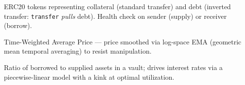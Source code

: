 \documentclass[10pt,a4paper,twocolumn]{article}
\theoremstyle{definition}
\theoremstyle{plain}
\theoremstyle{remark}
\begin{document}
\begin{description}[leftmargin=!,labelwidth=2.5cm]
    \item[Supply / Borrow Position] ERC20 tokens representing collateral (standard transfer) and debt (inverted transfer: \texttt{transfer} \emph{pulls} debt). Health check on sender (supply) or receiver (borrow).

    \item[TWAP] Time-Weighted Average Price --- price smoothed via log-space EMA (geometric mean temporal averaging) to resist manipulation.

    \item[Utilization] Ratio of borrowed to supplied assets in a vault; drives interest rates via a piecewise-linear model with a kink at optimal utilization.
\end{description}

\clearpage
\ifodd\value{page}\else\thispagestyle{empty}\null\clearpage\fi
\end{document}
